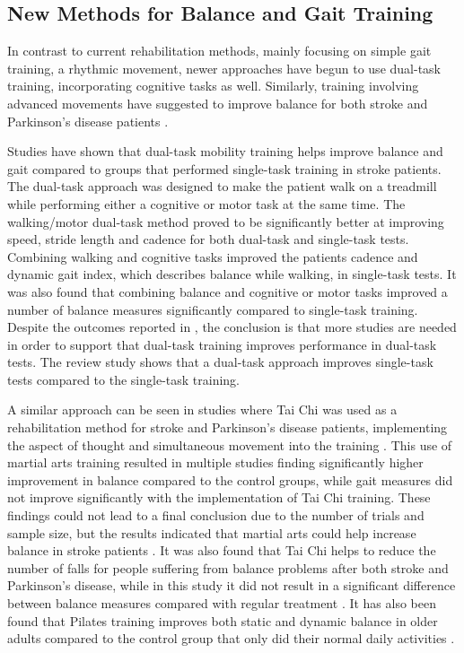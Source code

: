 \subsection{New Methods for Balance and Gait Training}

In contrast to current rehabilitation methods, mainly focusing on simple gait training, a rhythmic movement, newer approaches have begun to use dual-task training, incorporating cognitive tasks as well. Similarly, training involving advanced movements have suggested to improve balance for both stroke and Parkinson's disease patients \cite{Ding2012,Winser2018}. 

Studies have shown that dual-task mobility training helps improve balance and gait compared to groups that performed single-task training in stroke patients. The dual-task approach was designed to make the patient walk on a treadmill while performing either a cognitive or motor task at the same time. \cite{He2018}
The walking/motor dual-task method proved to be significantly better at improving speed, stride length and cadence for both dual-task and single-task tests. Combining walking and cognitive tasks improved the patients cadence and dynamic gait index, which describes balance while walking, in single-task tests. It was also found that combining balance and cognitive or motor tasks improved a number of balance measures significantly compared to single-task training. \cite{He2018}
Despite the outcomes reported in \cite{He2018}, the conclusion is that more studies are needed in order to support that dual-task training improves performance in dual-task tests. The review study shows that a dual-task approach improves single-task tests compared to the single-task training. \cite{He2018}

A similar approach can be seen in studies where Tai Chi was used as a rehabilitation method for stroke and Parkinson's disease patients, implementing the aspect of thought and simultaneous movement into the training \cite{Ding2012,Winser2018}. This use of martial arts training resulted in multiple studies finding significantly higher improvement in balance compared to the control groups, while gait measures did not improve significantly with the implementation of Tai Chi training. \cite{Ding2012}
These findings could not lead to a final conclusion due to the number of trials and sample size, but the results indicated that martial arts could help increase balance in stroke patients \cite{Ding2012}. It was also found that Tai Chi helps to reduce the number of falls for people suffering from balance problems after both stroke and Parkinson's disease, while in this study it did not result in a significant difference between balance measures compared with regular treatment \cite{Winser2018}. It has also been found that Pilates training improves both static and dynamic balance in older adults compared to the control group that only did their normal daily activities \cite{Moreno2017}.